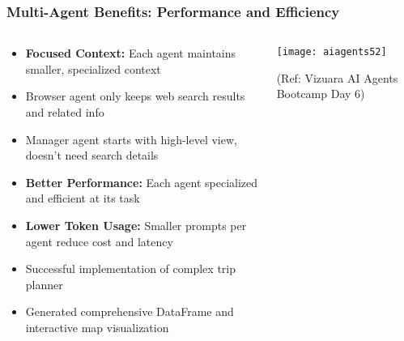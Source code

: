 \begin{frame}[fragile]\frametitle{Multi-Agent Benefits: Performance and Efficiency}
\begin{columns}
    \begin{column}[T]{0.6\linewidth}
      \begin{itemize}
		\item \textbf{Focused Context:} Each agent maintains smaller, specialized context
		\item Browser agent only keeps web search results and related info
		\item Manager agent starts with high-level view, doesn't need search details
		\item \textbf{Better Performance:} Each agent specialized and efficient at its task
		\item \textbf{Lower Token Usage:} Smaller prompts per agent reduce cost and latency
		\item Successful implementation of complex trip planner
		\item Generated comprehensive DataFrame and interactive map visualization
	  \end{itemize}
    \end{column}
    \begin{column}[T]{0.4\linewidth}
		\begin{center}
		\texttt{[image: aiagents52]}
		
		{\tiny (Ref: Vizuara AI Agents Bootcamp Day 6)}
		\end{center}	
    \end{column}
  \end{columns}
\end{frame}

